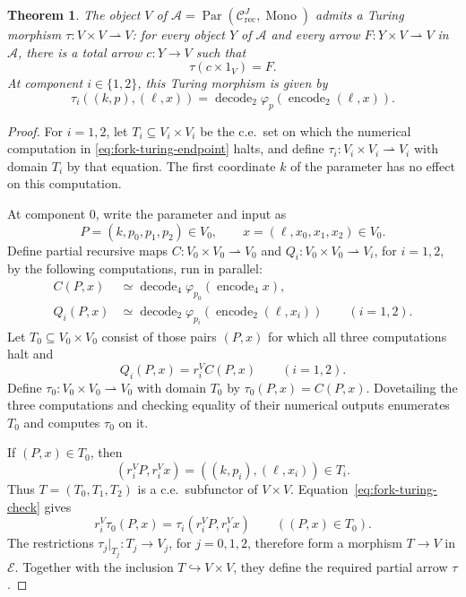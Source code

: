 \documentclass[11pt]{article}
\newtheorem{theorem}{Theorem}[section]
\begin{document}
\begin{theorem}\label{thm:fork-turing}
The object $V$ of
$\mathcal A=\operatorname{Par}(\mathcal C_{\mathrm{rec}}^J,
\operatorname{Mono})$ admits a Turing morphism
$\tau:V\times V\rightharpoonup V$: for every object $Y$ of
$\mathcal A$ and every arrow $F:Y\times V\rightharpoonup V$
in $\mathcal A$, there is a total arrow
$c:Y\to V$ such that
\[
 \tau(c\times1_V)=F.
\]
At component $i\in\{1,2\}$, this Turing morphism is given by
\begin{equation}\label{eq:fork-turing-endpoint}
 \tau_i((k,p),(\ell,x))
 =\operatorname{decode}_2
     \varphi_p(\operatorname{encode}_2(\ell,x)).
\end{equation}
\end{theorem}

\begin{proof}
For $i=1,2$, let $T_i\subseteq V_i\times V_i$ be the c.e.\ set
on which the numerical computation in
\eqref{eq:fork-turing-endpoint} halts, and define
$\tau_i:V_i\times V_i\rightharpoonup V_i$ with domain $T_i$
by that equation. The first coordinate $k$
of the parameter has no effect on this computation.

At component $0$, write the parameter and input as
\[
 P=(k,p_0,p_1,p_2)\in V_0,
 \qquad x=(\ell,x_0,x_1,x_2)\in V_0.
\]
Define partial recursive maps
$C:V_0\times V_0\rightharpoonup V_0$ and
$Q_i:V_0\times V_0\rightharpoonup V_i$, for $i=1,2$,
by the following computations, run in parallel:
\begin{align*}
 C(P,x)&\simeq
   \operatorname{decode}_4
      \varphi_{p_0}(\operatorname{encode}_4 x),\\
 Q_i(P,x)&\simeq
   \operatorname{decode}_2
      \varphi_{p_i}(\operatorname{encode}_2(\ell,x_i))
      \qquad(i=1,2).
\end{align*}
Let $T_0\subseteq V_0\times V_0$ consist of those pairs $(P,x)$
for which all three computations halt and
\begin{equation}\label{eq:fork-turing-check}
 Q_i(P,x)=r_i^V C(P,x)\qquad(i=1,2).
\end{equation}
Define $\tau_0:V_0\times V_0\rightharpoonup V_0$ with domain
$T_0$ by $\tau_0(P,x)=C(P,x)$.
Dovetailing the three computations and checking equality of their
numerical outputs enumerates $T_0$ and computes $\tau_0$ on it.

If $(P,x)\in T_0$, then
\[
 (r_i^V P,r_i^V x)=((k,p_i),(\ell,x_i))\in T_i.
\]
Thus $T=(T_0,T_1,T_2)$ is a c.e.\ subfunctor of $V\times V$.
Equation~\eqref{eq:fork-turing-check} gives
\[
 r_i^V\tau_0(P,x)
   =\tau_i(r_i^V P,r_i^V x)
 \qquad((P,x)\in T_0).
\]
The restrictions $\tau_j|_{T_j}:T_j\to V_j$, for $j=0,1,2$,
therefore form a morphism $T\to V$ in $\mathcal E$.
Together with the inclusion $T\hookrightarrow V\times V$,
they define the required partial arrow $\tau$.


\end{proof}
\end{document}
